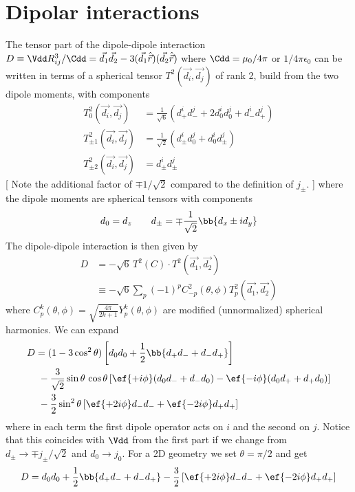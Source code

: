 \section{Dipolar interactions}
The tensor part of the dipole-dipole interaction $D\equiv \Vdd R_{ij}^3/\Cdd=\vec{d_1}\vec{d_2}-3(\vec{d_1}\hat{\vec{r}})(\vec{d_2}\hat{\vec{r}})$ where $\Cdd = \mu_0 /4\pi$ or $1/4\pi\epsilon_0$ can be written in terms of a spherical tensor $T^2(\vec{d_i},\vec{d_j})$ of rank 2, build from the two dipole moments, with components
\begin{align*}
T^2_0(\vec{d_i},\vec{d_j}) &= \frac{1}{\sqrt{6}} (d^i_+ d^j_- + 2d^i_0 d^j_0 + d^i_{-} d^j_{+})\\
T^2_{\pm 1}(\vec{d_i},\vec{d_j}) &= \frac{1}{\sqrt{2}} (d^i_{\pm} d^j_0 + d^i_0 d^j_{\pm})\\
T^2_{\pm 2}(\vec{d_i},\vec{d_j}) &= d^i_{\pm} d^j_{\pm} \phantom{\frac{1}{\sqrt{42}}}
\end{align*}
[ Note the additional factor of $\mp 1/\sqrt{2}$ compared to the definition of $j_\pm$. ]
where the dipole moments are spherical tensors with components
\begin{align}\label{eq:dipsph}
d_0 = d_z\qquad d_\pm = \mp\frac{1}{\sqrt{2}}\bb{d_x\pm i d_y}
\end{align}
The dipole-dipole interaction is then given by
\begin{align}
D &= -\sqrt{6} \,T^2(C)\cdot T^2(\vec{d_1},\vec{d_2})\\
&\equiv-\sqrt{6}  \sum_p (-1)^p C^2_{-p}(\theta,\phi) T^2_p(\vec{d_1},\vec{d_2})\nonumber
\end{align}
where $C^k_p(\theta,\phi)=\sqrt{\frac{4\pi}{2k+1}} Y^k_p(\theta,\phi)$ are modified (unnormalized) spherical harmonics. We can expand
\begin{align}\label{eq:doperator}
D &= (1-3\cos^2 \theta) \left[d_0 d_0 + \frac{1}{2}\bb{d_+ d_- + d_- d_+} \right] \\
&\,\,-\frac{3}{\sqrt{2}}\sin\theta \,\cos\theta \left[ \ef{+i\phi} (d_0 d_- + d_- d_0) - \ef{-i\phi} (d_0 d_+ + d_+ d_0) \right]\nonumber\\
&\,\,-\frac{3}{2}\sin^2\theta \left[ \ef{+2i\phi} d_- d_- + \ef{-2i\phi} d_+ d_+\right]\nonumber
\end{align}
where in each term the first dipole operator acts on $i$ and the second on $j$. Notice that this coincides with $\Vdd$ from the first part if we change from $d_\pm \rightarrow \mp j_\pm/\sqrt{2}$ and $d_0\rightarrow j_0$.
For a 2D geometry we set $\theta=\pi/2$ and get
\begin{align*}
D = d_0 d_0 + \frac{1}{2}\bb{d_+ d_- + d_- d_+} -\frac{3}{2} \left[ \ef{+2i\phi} d_- d_- + \ef{-2i\phi} d_+ d_+\right]
\end{align*}
